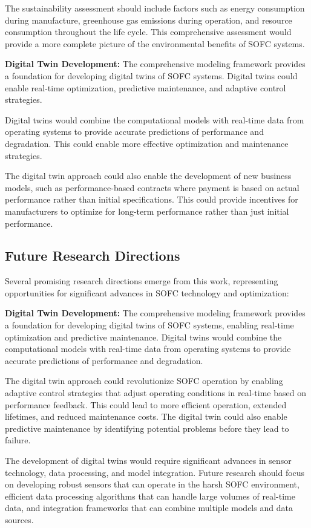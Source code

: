 \documentclass[conference]{IEEEtran}
\begin{document}
The sustainability assessment should include factors such as energy consumption during manufacture, greenhouse gas emissions during operation, and resource consumption throughout the life cycle. This comprehensive assessment would provide a more complete picture of the environmental benefits of SOFC systems.

\textbf{Digital Twin Development:} The comprehensive modeling framework provides a foundation for developing digital twins of SOFC systems. Digital twins could enable real-time optimization, predictive maintenance, and adaptive control strategies.

Digital twins would combine the computational models with real-time data from operating systems to provide accurate predictions of performance and degradation. This could enable more effective optimization and maintenance strategies.

The digital twin approach could also enable the development of new business models, such as performance-based contracts where payment is based on actual performance rather than initial specifications. This could provide incentives for manufacturers to optimize for long-term performance rather than just initial performance.

\subsection{Future Research Directions}

Several promising research directions emerge from this work, representing opportunities for significant advances in SOFC technology and optimization:

\textbf{Digital Twin Development:} The comprehensive modeling framework provides a foundation for developing digital twins of SOFC systems, enabling real-time optimization and predictive maintenance. Digital twins would combine the computational models with real-time data from operating systems to provide accurate predictions of performance and degradation.

The digital twin approach could revolutionize SOFC operation by enabling adaptive control strategies that adjust operating conditions in real-time based on performance feedback. This could lead to more efficient operation, extended lifetimes, and reduced maintenance costs. The digital twin could also enable predictive maintenance by identifying potential problems before they lead to failure.

The development of digital twins would require significant advances in sensor technology, data processing, and model integration. Future research should focus on developing robust sensors that can operate in the harsh SOFC environment, efficient data processing algorithms that can handle large volumes of real-time data, and integration frameworks that can combine multiple models and data sources.
\end{document}
